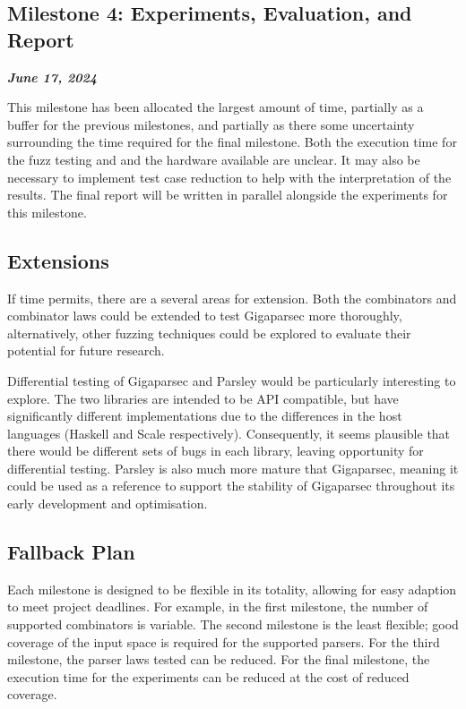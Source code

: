 \documentclass{article}
\newcommand{\be}[1]{\textbf{\emph{#1}}}
\begin{document}
\subsection{Milestone 4: Experiments, Evaluation, and Report}
\be{June 17, 2024}

This milestone has been allocated the largest amount of time, partially as a buffer for the previous milestones, and partially as there some uncertainty surrounding the time required for the final milestone. Both the execution time for the fuzz testing and and the hardware available are unclear. It may also be necessary to implement test case reduction to help with the interpretation of the results. The final report will be written in parallel alongside the experiments for this milestone.

\subsection{Extensions}

If time permits, there are a several areas for extension. Both the combinators and combinator laws could be extended to test Gigaparsec more thoroughly, alternatively, other fuzzing techniques could be explored to evaluate their potential for future research.

Differential testing of Gigaparsec and Parsley \cite{garnishing} would be particularly interesting to explore. The two libraries are intended to be API compatible, but have significantly different implementations due to the differences in the host languages (Haskell and Scale respectively). Consequently, it seems plausible that there would be different sets of bugs in each library, leaving opportunity for differential testing. Parsley is also much more mature that Gigaparsec, meaning it could be used as a reference to support the stability of Gigaparsec throughout its early development and optimisation.

\subsection{Fallback Plan}
Each milestone is designed to be flexible in its totality, allowing for easy adaption to meet project deadlines. For example, in the first milestone, the number of supported combinators is variable. The second milestone is the least flexible; good coverage of the input space is required for the supported parsers. For the third milestone, the parser laws tested can be reduced. For the final milestone, the execution time for the experiments can be reduced at the cost of reduced coverage.

\raggedright

\end{document}

